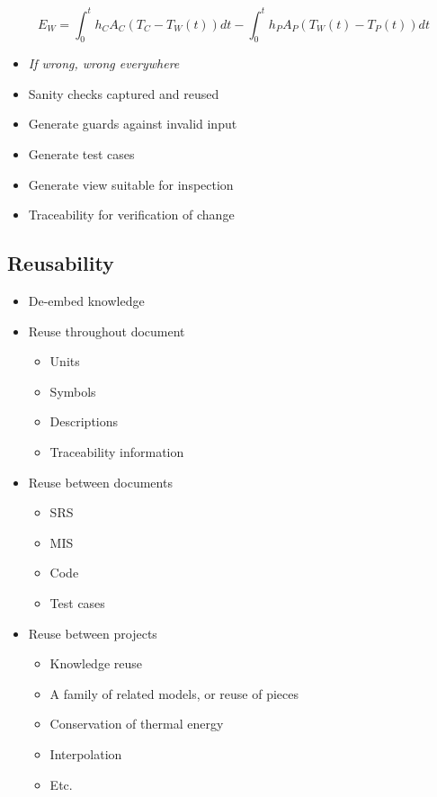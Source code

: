 \documentclass[sigconf]{acmart}
\begin{document}
\begin{equation*}
E_W = \int_{0}^{t} h_C A_C (T_C - T_W(t)) dt - \int_{0}^{t} h_P A_P (T_W(t) - T_P(t)) dt
\end{equation*}

\begin{itemize}
\item \emph{If wrong, wrong everywhere}
\item Sanity checks captured and reused
\item Generate guards against invalid input
\item Generate test cases
\item Generate view suitable for inspection
\item Traceability for verification of change
\end{itemize}

\subsection{Reusability}

\begin{itemize}
\item De-embed knowledge
\item Reuse throughout document
\begin{itemize}
\item Units
\item Symbols
\item Descriptions
\item Traceability information
\end{itemize}
\item Reuse between documents
\begin{itemize}
\item SRS
\item MIS
\item Code
\item Test cases
\end{itemize}
\item Reuse between projects
\begin{itemize}
\item Knowledge reuse
\item A family of related models, or reuse of pieces
\item Conservation of thermal energy
\item Interpolation
\item Etc.
\end{itemize}
\end{itemize}
\end{document}
